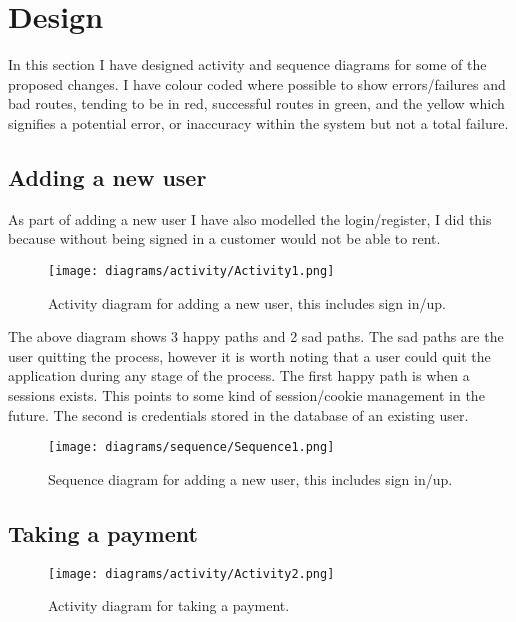 \section{Design}
  In this section I have designed activity and sequence diagrams for some of the proposed changes. I have colour coded where possible to show
  errors/failures and bad routes, tending to be in red, successful routes in green, and the yellow which signifies a potential error, or
  inaccuracy within the system but not a total failure.

  \subsection{Adding a new user}
    As part of adding a new user I have also modelled the login/register, I did this because without being signed in a customer
    would not be able to rent.

    \begin{figure}[H]
      \centering
      \texttt{[image: diagrams/activity/Activity1.png]}
      \caption{Activity diagram for adding a new user, this includes sign in/up.}
      \label{fig:newUserActivity}
    \end{figure}

    The above diagram shows 3 happy paths and 2 sad paths. The sad paths are the user quitting the process, however it is worth
    noting that a user could quit the application during any stage of the process. The first happy path is when a sessions exists.
    This points to some kind of session/cookie management in the future. The second is credentials stored in the database of an 
    existing user.

    \begin{figure}[H]
      \centering
      \texttt{[image: diagrams/sequence/Sequence1.png]}
      \caption{Sequence diagram for adding a new user, this includes sign in/up.}
      \label{fig:newUserSequence}
    \end{figure}
  
  \newpage
  
  \subsection{Taking a payment}

    \begin{figure}[H]
      \centering
      \texttt{[image: diagrams/activity/Activity2.png]}
      \caption{Activity diagram for taking a payment.}
      \label{fig:takePaymentActivity}
    \end{figure}

